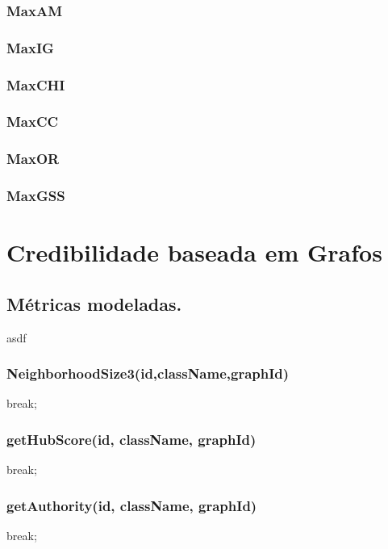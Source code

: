 \subsubsection{MaxAM}
\label{subsubsection::maxam}

\subsubsection{MaxIG}
\label{subsubsection::maxig}

\subsubsection{MaxCHI}
\label{subsubsection::maxchi}

\subsubsection{MaxCC}
\label{subsubsection::maxcc}

\subsubsection{MaxOR}
\label{subsubsection::maxor}

\subsubsection{MaxGSS}
\label{subsubsection::maxgss}




\section{Credibilidade baseada em Grafos}
\label{sec::pg_cred_baseada_grafos}

\subsection{Métricas modeladas.}
\label{subsec::pg_metricas_grafos}

asdf


\subsubsection{NeighborhoodSize3(id,className,graphId)}
break;
\subsubsection{getHubScore(id, className, graphId)}
break;
\subsubsection{getAuthority(id, className, graphId)}
break;
